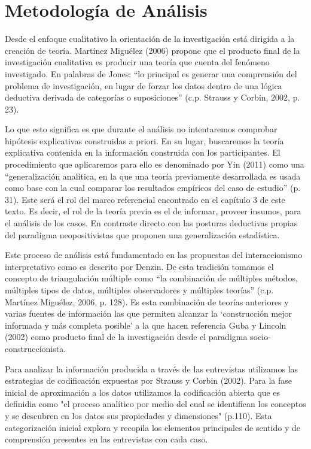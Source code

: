 \section{Metodología de Análisis}
Desde el enfoque cualitativo la orientación de la investigación está dirigida a
la creación de teoría.
Martínez Miguélez (2006) propone que el producto final de la investigación
cualitativa es producir una teoría que cuenta del fenómeno investigado.
En palabras de Jones: “lo principal es generar una comprensión del problema de
investigación, en lugar de forzar los datos dentro de una lógica deductiva
derivada de categorías o suposiciones” (c.p. Strauss y Corbin, 2002, p. 23).

Lo que esto significa es que durante el análisis no intentaremos comprobar
hipótesis explicativas construidas a priori.
En su lugar, buscaremos la teoría explicativa contenida en la información
construida con los participantes.
El procedimiento que aplicaremos para ello es denominado por Yin (2011) como una
“generalización analítica, en la que una teoría previamente desarrollada es
usada como base con la cual comparar los resultados empíricos del caso de
estudio” (p. 31).
Este será el rol del marco referencial encontrado en el capítulo 3 de este
texto.
Es decir, el rol de la teoría previa es el de informar, proveer insumos, para el
análisis de los casos.
En contraste directo con las posturas deductivas propias del paradigma
neopositivistas que proponen una generalización estadística.

Este proceso de análisis está fundamentado en las propuestas del interaccionismo
interpretativo como es descrito por Denzin.
De esta tradición tomamos el concepto de triangulación múltiple como “la
combinación de múltiples métodos, múltiples tipos de datos, múltiples
observadores y múltiples teorías” (c.p. Martínez Miguélez, 2006, p. 128).
Es esta combinación de teorías anteriores y varias fuentes de información las
que permiten alcanzar la ‘construcción mejor informada y más completa
posible’ a la que hacen referencia Guba y Lincoln (2002) como producto final de
la investigación desde el paradigma socio-construccionista.

Para analizar la información producida a través de las entrevistas utilizamos
las estrategias de codificación expuestas por Strauss y Corbin (2002).
Para la fase inicial de aproximación a los datos utilizamos la codificación
abierta que es definidia como "el proceso analítico por medio del cual se
identifican los conceptos y se descubren en los datos sus propiedades y
dimensiones" (p.110).
Esta categorización inicial explora y recopila los elementos principales
de sentido y de comprensión presentes en las entrevistas con cada caso.

